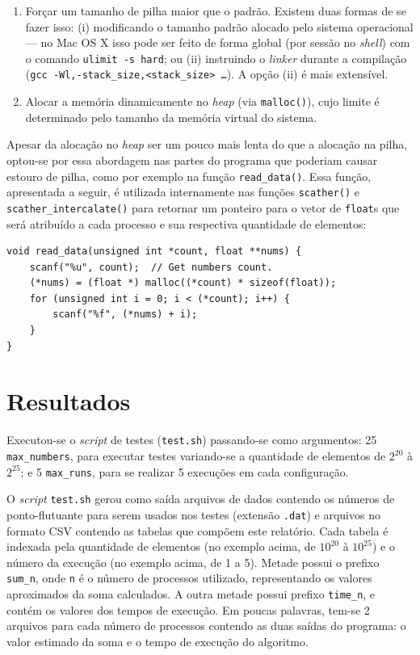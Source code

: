 \documentclass[12pt,a4paper]{article}
\begin{document}
\begin{enumerate}
    \item Forçar um tamanho de pilha maior que o padrão. Existem duas formas de
    se fazer isso: (i) modificando o tamanho padrão alocado pelo sistema
    operacional --- no Mac OS X isso pode ser feito de forma global (por sessão
    no \textit{shell}) com o comando \texttt{ulimit -s hard}; ou (ii) instruindo
    o \textit{linker} durante a compilação (\texttt{gcc
    -Wl,-stack\_size,<stack\_size> \ldots}). A opção (ii) é mais extensível. 
    \item Alocar a memória dinamicamente no \textit{heap} (via
    \texttt{malloc()}), cujo limite é determinado pelo tamanho da memória
    virtual do sistema.
\end{enumerate}

Apesar da alocação no \textit{heap} ser um pouco mais lenta do que a alocação na
pilha, optou-se por essa abordagem nas partes do programa que poderiam causar
estouro de pilha, como por exemplo na função \texttt{read\_data()}. Essa função,
apresentada a seguir, é utilizada internamente nas funções \texttt{scather()} e
\texttt{scather\_intercalate()} para retornar um ponteiro para o vetor de
\texttt{float}s que será atribuído a cada processo e sua respectiva quantidade
de elementos:

\begin{lstlisting}[style=c, numbers=none]
void read_data(unsigned int *count, float **nums) {
	scanf("%u", count);  // Get numbers count.
	(*nums) = (float *) malloc((*count) * sizeof(float));
	for (unsigned int i = 0; i < (*count); i++) {
		scanf("%f", (*nums) + i); 
	}
}
\end{lstlisting}

\section{Resultados}
\label{sec:resultados}
Executou-se o \textit{script} de testes (\texttt{test.sh}) passando-se como
argumentos: 25 \texttt{max\_numbers}, para executar testes variando-se a
quantidade de elementos de $2^{20}$ à $2^{25}$; e 5 \texttt{max\_runs}, para se
realizar 5 execuções em cada configuração.

O \textit{script} \texttt{test.sh} gerou como saída arquivos de dados contendo
os números de ponto-flutuante para serem usados nos testes (extensão
\texttt{.dat}) e arquivos no formato CSV contendo as tabelas que compõem este
relatório. Cada tabela é indexada pela quantidade de elementos (no exemplo
acima, de $10^{20}$ à $10^{25}$) e o número da execução (no exemplo acima, de 1
a 5). Metade possui o prefixo \texttt{sum\_{n}}, onde \texttt{n} é o número de
processos utilizado, representando os valores aproximados da soma calculados. A
outra metade possui prefixo \texttt{time\_{n}}, e contém os valores dos tempos
de execução.  Em poucas palavras, tem-se 2 arquivos para cada número de
processos contendo as duas saídas do programa: o valor estimado da soma e o
tempo de execução do algoritmo.
\end{document}
